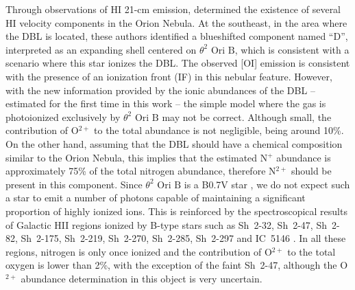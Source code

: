\documentclass[twocolumn]{aastex63}
\begin{document}
Through observations of H\thinspace I 21-cm emission, \citet{vanderWerf13} determined the existence of several H\thinspace I velocity components in  the Orion Nebula. At the southeast, in the area where the DBL is located, these authors identified a blueshifted component named ``D'', interpreted as an expanding shell centered on $\theta^{2} \text{ Ori B}$, which is consistent with a scenario where this star ionizes the DBL. The observed [O\thinspace I] emission is consistent with the presence of an ionization front (IF) in this nebular feature. However, with the new information provided by the ionic abundances of the DBL -- estimated for the first time in this work -- the simple model where the gas is photoionized exclusively by $\theta^{2} \text{ Ori B}$ may not be correct. Although small, the contribution of O$^{2+}$ to the total abundance is not negligible, being around 10\%. On the other hand, assuming that the DBL should have a chemical composition similar to the Orion Nebula, this implies that the estimated N$^{+}$ abundance is approximately 75\% of the total nitrogen abundance, therefore N$^{2+}$ should be present in this component. Since $\theta^{2} \text{ Ori B}$ is a B0.7V star \citep{simondiaz10}, we do not expect such a star to emit a number of  photons capable of maintaining a significant proportion of highly ionized ions. This is reinforced by the spectroscopical results of Galactic  H\thinspace II regions ionized by B-type stars such as Sh~2-32, Sh~2-47, Sh~2-82, Sh~2-175, Sh~2-219, Sh~2-270, Sh~2-285, Sh~2-297 and IC~5146 \citep{garciarojas14,estebanygarciarojas18,arellanocordova2020B}. In all these regions, nitrogen is only once ionized and the contribution of O$^{2+}$ to the total oxygen is lower than 2\%, with the exception of the faint Sh~2-47, although the O$^{2+}$ abundance determination in this object is very uncertain. 
\end{document}
